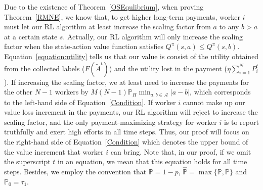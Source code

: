 Due to the existence of Theorem~\ref{OSEqulibrium}, when proving Theorem~\ref{RMNE}, we know that, to get higher long-term payments, worker $i$ must let our RL algorithm at least increase the scaling factor from $a$ to any $b>a$ at a certain state $s$.
Actually, our RL algorithm will only increase the scaling factor when the state-action value function satisfies $Q^{\pi}(s,a)\leq Q^{\pi}(s,b)$.
Equation~\ref{equation:utility} tells us that our value is consist of the utility obtained from the collected labels ($F(\tilde{A}^t)$) and the utility lost in the payment ($\eta {\sum}_{i=1}^{N}P^t_i$).
If increasing the scaling factor, we at least need to increase the payments for the other $N-1$ workers by $M(N-1)\mathbb{P}_H\min_{a,b\in\mathcal{A}}|a-b|$, which corresponds to the left-hand side of Equation~\ref{Condition}.
If worker $i$ cannot make up our value loss increment in the payments, our RL algorithm will reject to increase the scaling factor, and the only payment-maximizing strategy for worker $i$ is to report truthfully and exert high efforts in all time steps.
Thus, our proof will focus on the right-hand side of Equation~\ref{Condition} which denotes the upper bound of the value increment that worker $i$ can bring.
Note that, in our proof, if we omit the superscript $t$ in an equation, we mean that this equation holds for all time steps.
Besides, we employ the convention that $\bar{\mathbb{P}}=1-p$, $\hat{\mathbb{P}}=\max \{\mathbb{P}, \bar{\mathbb{P}}\}$ and $\mathbb{P}_0=\tau_1$.


